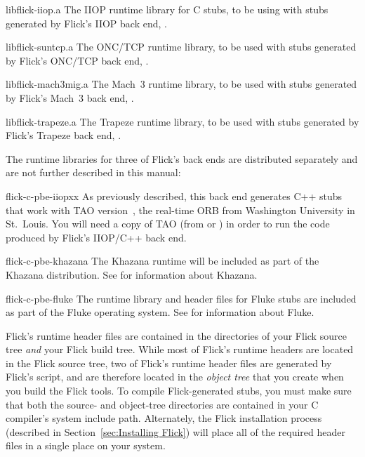 \begin{filenamelist}
  \item[libflick-iiop.a] The IIOP runtime library for C stubs, to be using with
  stubs generated by Flick's IIOP back end, .

  \item[libflick-suntcp.a] The ONC/TCP runtime library, to be used with stubs
  generated by Flick's ONC/TCP back end, .

  \item[libflick-mach3mig.a] The Mach~3 runtime library, to be used with stubs
  generated by Flick's Mach~3 back end, .

  \item[libflick-trapeze.a] The Trapeze runtime library, to be used with stubs
  generated by Flick's Trapeze back end, .
\end{filenamelist}

The runtime libraries for three of Flick's back ends are distributed separately
and are not further described in this manual:

\begin{commandlist}
  \item[flick-c-pbe-iiopxx] As previously described, this back end generates
  C++ stubs that work with TAO version~\taoversion{}, the real-time ORB from
  Washington University in St.\ Louis.  You will need a copy of TAO (from
  \taourl{} or \taosrcurl{}) in order to run the code produced by Flick's
  IIOP/C++ back end.

  \item[flick-c-pbe-khazana] The Khazana runtime will be included as part of
  the Khazana distribution.  See \khazanaurl{} for information about Khazana.

  \item[flick-c-pbe-fluke] The runtime library and header files for Fluke stubs
  are included as part of the Fluke operating system.  See \flukeurl{} for
  information about Fluke.
\end{commandlist}

Flick's runtime header files are contained in the 
directories of your Flick source tree \emph{and} your Flick build tree.  While
most of Flick's runtime headers are located in the Flick source tree, two of
Flick's runtime header files are generated by Flick's 
script, and are therefore located in the \emph{object tree} that you create
when you build the Flick tools.  To compile Flick-generated stubs, you must
make sure that both the source- and object-tree 
directories are contained in your C compiler's system include path.
Alternately, the Flick installation process (described in
Section~\ref{sec:Installing Flick}) will place all of the required header files
in a single place on your system.

